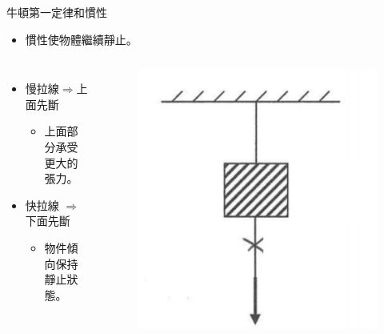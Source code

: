\documentclass[beamer=true]{standalone}
\begin{document}
\begin{frame}{牛頓第一定律和慣性 }
    \begin{itemize}
        \item 慣性使物體繼續靜止。
    \end{itemize}
    \begin{columns}
        \begin{itemize}
            \item 慢拉線$\Rightarrow$上面先斷
                  \begin{itemize}
                      \item 上面部分承受更大的張力。
                  \end{itemize}
            \item 快拉線 $\Rightarrow$ 下面先斷
                  \begin{itemize}
                      \item 物件傾向保持靜止狀態。
                  \end{itemize}
        \end{itemize}
        \begin{figure}[h!]
            \centering
            \includegraphics[width=.8\textwidth]{assets/842a74ec.png}
        \end{figure}
    \end{columns}
\end{frame}
\end{document}
